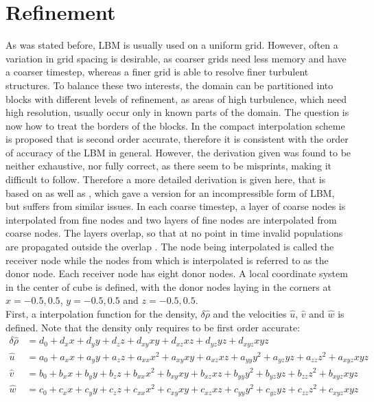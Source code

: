 \section{Refinement}
\label{app:refinement}
As was stated before, LBM is usually used on a uniform grid. However, often a variation in grid spacing is desirable, as coarser grids need less memory and have a coarser timestep, whereas a finer grid is able to resolve finer turbulent structures. To balance these two interests, the domain can be partitioned into blocks with different levels of refinement, as areas of high turbulence, which need high resolution, usually occur only in known parts of the domain. The question is now how to treat the borders of the blocks. In \cite{schonherr_towards_2015} the compact interpolation scheme is proposed that is second order accurate, therefore it is consistent with the order of accuracy of the LBM in general. However, the derivation given was found to be neither exhaustive, nor fully correct, as there seem to be misprints, making it difficult to follow. Therefore a more detailed derivation is given here, that is based on \cite{schonherr_towards_2015} as well as \cite{kutscher_multiscale_2019}, which gave a version for an incompressible form of LBM, but suffers from similar issues. In each coarse timestep, a layer of coarse nodes is interpolated from fine nodes and two layers of fine nodes are interpolated from coarse nodes. The layers overlap, so that at no point in time invalid populations are propagated outside the overlap \cite{schonherr_towards_2015}. The node being interpolated is called the receiver node while the nodes from which is interpolated is referred to as the donor node. Each receiver node has eight donor nodes. A local coordinate system in the center of cube is defined, with the donor nodes laying in the corners at $x={-0.5, 0.5}$, $y={-0.5,0.5}$ and $z={-0.5,0.5}$. \\First, a interpolation function for the density, $\delta \hat{\rho}$ and the velocities $\hat{u}$, $\hat{v}$ and $\hat{w}$ is defined. Note that the density only requires to be first order accurate:
\begin{align}
	 \delta \hat{\rho} &= d_0 + d_x x + d_y y + d_z z + d_{xy}xy + d_{xz}xz + d_{yz}yz + d_{xyz}xyz \\
	\hat{u} &= a_0 + a_x x + a_y y + a_z z + a_{xx} x^2 + a_{xy} xy + a_{xz} xz + a_{yy} y^2 + a_{yz} yz + a_{zz} z^2 + a_{xyz}xyz \\
	\hat{v} &= b_0 + b_x x + b_y y + b_z z + b_{xx} x^2 + b_{xy} xy + b_{xz} xz + b_{yy} y^2 + b_{yz} yz + b_{zz} z^2 + b_{xyz}xyz \\
	\hat{w} &= c_0 + c_x x + c_y y + c_z z + c_{xx} x^2 + c_{xy} xy + c_{xz} xz + c_{yy} y^2 + c_{yz} yz + c_{zz} z^2 + c_{xyz}xyz
\end{align}
